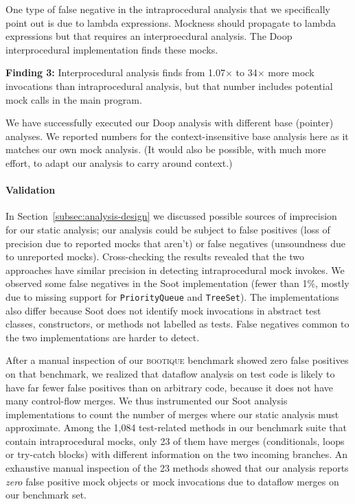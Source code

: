 One type of false negative in the intraprocedural analysis that we specifically point out is due to lambda expressions. Mockness should propagate to lambda expressions but that requires an interproecdural analysis. The Doop interprocedural implementation finds these mocks.

\begin{mdframed}[
	leftmargin=\parindent,
	rightmargin=\parindent,
	skipabove=\topsep,
	skipbelow=\topsep
	]
	{\bf Finding 3:} Interprocedural analysis finds from 1.07$\times$ to 34$\times$ more mock invocations than intraprocedural analysis, but that number includes potential mock calls in the main program.
\end{mdframed}

We have successfully executed our Doop analysis with different base (pointer) analyses. We reported numbers for the context-insensitive base analysis here as it matches our own mock analysis. (It would also be possible, with much more effort, to adapt our analysis to carry around context.)

\paragraph{Validation} In Section~\ref{subsec:analysis-design} we discussed possible sources of imprecision for our static analysis; our analysis could be subject to false positives (loss of precision due to reported mocks that aren't) or false negatives (unsoundness due to unreported mocks). Cross-checking the results revealed that the two approaches have similar precision in detecting intraprocedural mock invokes. We observed some false negatives in the Soot implementation (fewer than 1\%, mostly due to missing support for \texttt{PriorityQueue} and \texttt{TreeSet}). The implementations also differ because Soot does not identify mock invocations in abstract test classes, constructors, or methods not labelled as tests. False negatives common to the two implementations are harder to detect.

After a manual inspection of our \textsc{bootique} benchmark showed zero false positives on that benchmark, we realized that dataflow analysis on test code is likely to have far fewer false positives than on arbitrary code, because it does not have many control-flow merges. We thus instrumented our Soot analysis implementations to count the number of merges where our static analysis must approximate. Among the 1,084 test-related methods in our benchmark suite that contain intraprocedural mocks, only 23 of them have merges (conditionals, loops or try-catch blocks) with different information on the two incoming branches.  An exhaustive manual inspection of the 23 methods showed that our analysis reports \emph{zero} false positive mock objects or mock invocations due to dataflow merges on our benchmark set.


